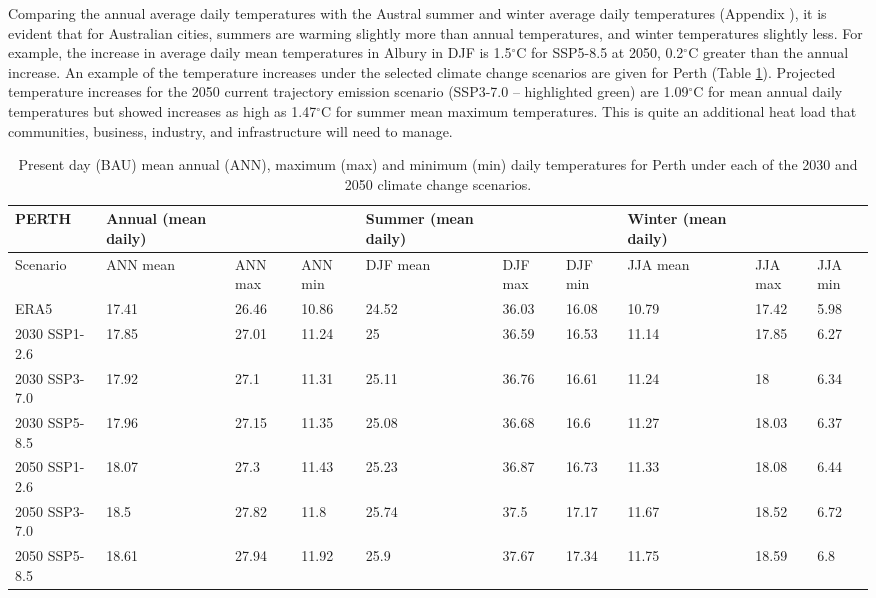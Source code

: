 \documentclass[utf8]{frontiersSCNS} %
\begin{document}
Comparing the annual average daily temperatures with the Austral summer and winter average daily temperatures (Appendix \label{section:appendix2}), it is evident that for Australian cities, summers are warming slightly more than annual temperatures, and winter temperatures slightly less.  For example, the increase in average daily mean temperatures in Albury in DJF is 1.5$^{\circ}$C for SSP5-8.5 at 2050, 0.2$^{\circ}$C greater than the annual increase. An example of the temperature increases under the selected climate change scenarios are given for Perth (Table \ref{table:perth}). Projected temperature increases for the 2050 current trajectory emission scenario (SSP3-7.0 – highlighted green) are 1.09$^{\circ}$C for mean annual daily temperatures but showed increases as high as 1.47$^{\circ}$C for summer mean maximum temperatures. This is quite an additional heat load that communities, business, industry, and infrastructure will need to manage.

\setlength\arrayrulewidth{1pt} %
\begin{table}[!ht]\caption{Present day (BAU) mean annual (ANN), maximum (max) and minimum (min) daily temperatures for Perth under each of the 2030 and 2050 climate change scenarios.}
    \centering
    \begin{tabular}{|l|p{1.5cm}|p{1.1cm}|p{1.1cm}|p{1.5cm}|p{1.1cm}|p{1.1cm}|p{1.5cm}|p{1.1cm}|p{1.1cm}|}
    \hline
        PERTH & Annual (mean daily) \cellcolor{light-gray}& ~ \cellcolor{light-gray}& ~\cellcolor{light-gray}& Summer (mean daily)\cellcolor{yellow!25}& ~\cellcolor{yellow!25} & ~\cellcolor{yellow!25} & Winter (mean daily)  \cellcolor{light-blue!25} & ~ \cellcolor{light-blue!25}& ~ \cellcolor{light-blue!25}\\ \hline
        Scenario & ANN mean \cellcolor{light-gray}& ANN max \cellcolor{light-gray}& ANN min\cellcolor{light-gray} & DJF mean\cellcolor{yellow!25} & DJF max\cellcolor{yellow!25} & DJF min\cellcolor{yellow!25} & JJA mean \cellcolor{light-blue!25}& JJA max \cellcolor{light-blue!25}& JJA min \cellcolor{light-blue!25}\\ \hline
        ERA5 & 17.41 & 26.46 & 10.86 & 24.52 & 36.03 & 16.08 & 10.79 & 17.42 & 5.98 \\ \hline
        2030 SSP1-2.6 & 17.85 & 27.01 & 11.24 & 25 & 36.59 & 16.53 & 11.14 & 17.85 & 6.27 \\ \hline
        2030 SSP3-7.0 & 17.92 & 27.1 & 11.31 & 25.11 & 36.76 & 16.61 & 11.24 & 18 & 6.34 \\ \hline
        2030 SSP5-8.5 & 17.96 & 27.15 & 11.35 & 25.08 & 36.68 & 16.6 & 11.27 & 18.03 & 6.37 \\ \hline
        2050 SSP1-2.6 & 18.07 & 27.3 & 11.43 & 25.23 & 36.87 & 16.73 & 11.33 & 18.08 & 6.44 \\ \hline
        \rowcolor{light-green!25}2050 SSP3-7.0 & 18.5 & 27.82 & 11.8 & 25.74 & 37.5 & 17.17 & 11.67 & 18.52 & 6.72 \\ \hline
        2050 SSP5-8.5 & 18.61 & 27.94 & 11.92 & 25.9 & 37.67 & 17.34 & 11.75 & 18.59 & 6.8 \\ \hline
    \end{tabular}\label{table:perth}
\end{table}
\setlength\arrayrulewidth{0.4pt} %
\end{document}
